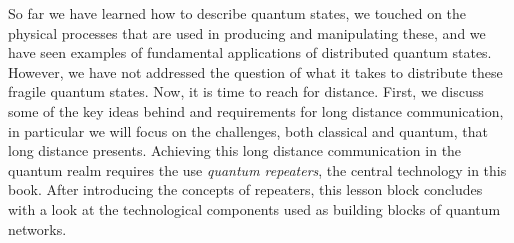 
\begin{partintro}
So far we have learned how to describe quantum states, we touched on the physical processes that are used in producing and manipulating these, and we have seen examples of fundamental applications of distributed quantum states.
However, we have not addressed the question of what it takes to distribute these fragile quantum states.
Now, it is time to reach for distance.
First, we discuss some of the key ideas behind and requirements for long distance communication, in particular we will focus on the challenges, both classical and quantum, that long distance presents.
Achieving this long distance communication in the quantum realm requires the use \emph{quantum repeaters}, the central technology in this book. After introducing the concepts of repeaters, this lesson block concludes with a look at the technological components used as building blocks of quantum networks.
\end{partintro}
